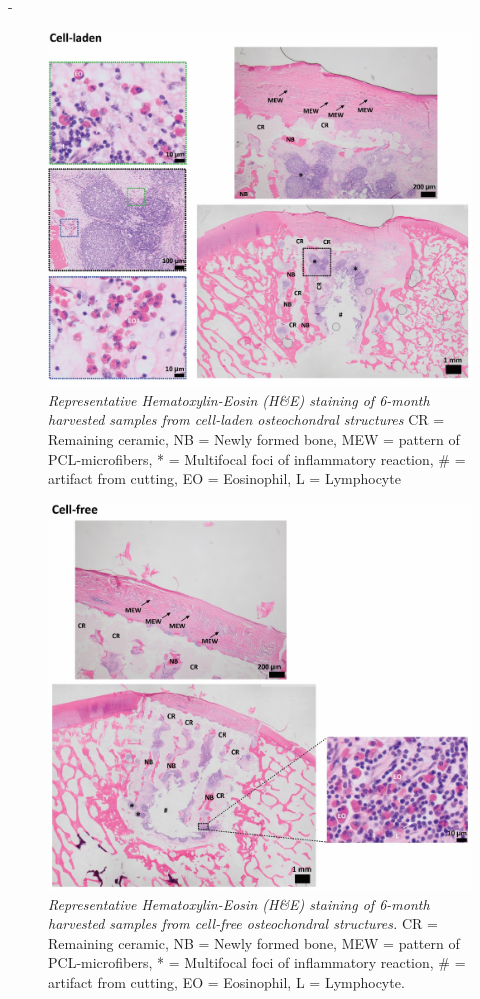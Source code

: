 \documentclass[twocolumn, empirical, authordate, issue]{jote-new-article}
\begin{document}
\begin{adjustwidth}{-\fullwidthlen}{}
\begin{figure}
\centering \includegraphics[width=1.02\columnwidth]{media/image17.jpg}
\caption{\emph{Representative Hematoxylin-Eosin (H\&E) staining of 6-month harvested samples from cell-laden osteochondral structures}  CR = Remaining ceramic, NB = Newly formed bone, MEW = pattern of PCL-microfibers, * = Multifocal foci of inflammatory reaction, \# = artifact from cutting, EO = Eosinophil, L = Lymphocyte}
\label{fig:sup6}\end{figure}


\begin{figure}
\centering \includegraphics[width=\columnwidth]{media/image18.jpg}
\caption{\emph{Representative Hematoxylin-Eosin (H\&E) staining of 6-month harvested samples from cell-free osteochondral structures.}  CR = Remaining ceramic, NB = Newly formed bone, MEW = pattern of PCL-microfibers, * = Multifocal foci of inflammatory reaction, \# = artifact from cutting, EO = Eosinophil, L = Lymphocyte.}
\label{fig:sup7}\end{figure}
\end{adjustwidth}
\end{document}
